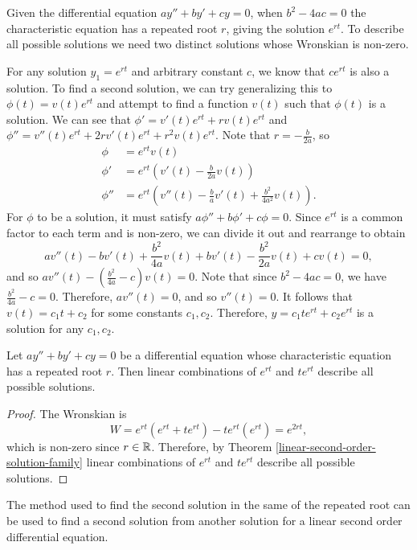 Given the differential equation $ay'' + by' + cy = 0$, when $b^2 - 4ac = 0$ the characteristic equation has a repeated root $r$, giving the solution $e^{rt}$. To describe all possible solutions we need two distinct solutions whose Wronskian is non-zero.

For any solution $y_1 = e^{rt}$ and arbitrary constant $c$, we know that $ce^{rt}$ is also a solution. To find a second solution, we can try generalizing this to $\phi(t) = v(t)e^{rt}$ and attempt to find a function $v(t)$ such that $\phi(t)$ is a solution. We can see that $\phi' = v'(t)e^{rt} + rv(t)e^{rt}$ and $\phi'' = v''(t)e^{rt} + 2rv'(t)e^{rt} + r^2v(t)e^{rt}$. Note that $r = -\frac{b}{2a}$, so
\begin{align*}
    \phi &= e^{rt}v(t) \\
    \phi' &= e^{rt}(v'(t) - \frac{b}{2a}v(t)) \\
    \phi'' &= e^{rt}(v''(t) - \frac{b}{a}v'(t) + \frac{b^2}{4a^2}v(t)).
\end{align*}
For $\phi$ to be a solution, it must satisfy $a\phi'' + b\phi' + c\phi = 0$. Since $e^{rt}$ is a common factor to each term and is non-zero, we can divide it out and rearrange to obtain
\[av''(t) - bv'(t) + \frac{b^2}{4a}v(t) + bv'(t) - \frac{b^2}{2a}v(t) + cv(t) = 0,\] and so $av''(t) - \left(\frac{b^2}{4a} - c\right)v(t) = 0$. Note that since $b^2 - 4ac = 0$, we have $\frac{b^2}{4a} - c = 0$. Therefore, $av''(t) = 0$, and so $v''(t) = 0$. It follows that $v(t) = c_1t + c_2$ for some constants $c_1, c_2$. Therefore, $y = c_1te^{rt} + c_2e^{rt}$ is a solution for any $c_1, c_2$.

\begin{thm}
    Let $ay'' + by' + cy = 0$ be a differential equation whose characteristic equation has a repeated root $r$. Then linear combinations of $e^{rt}$ and $te^{rt}$ describe all possible solutions.
\end{thm}

\begin{proof}
    The Wronskian is \[W = e^{rt}(e^{rt} + te^{rt}) - te^{rt}(e^{rt}) = e^{2rt},\] which is non-zero since $r \in \mathbb{R}$. Therefore, by Theorem \ref{linear-second-order-solution-family} linear combinations of $e^{rt}$ and $te^{rt}$ describe all possible solutions.
\end{proof}

\begin{rmk}
    The method used to find the second solution in the same of the repeated root can be used to find a second solution from another solution for a linear second order differential equation.
\end{rmk}

